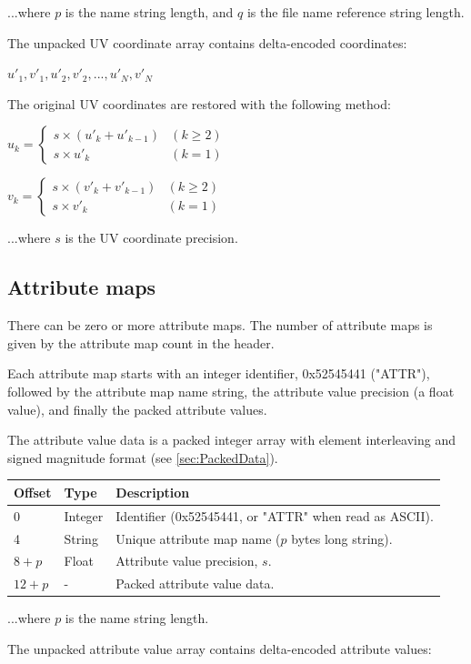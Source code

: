 ...where $p$ is the name string length, and $q$ is the file name reference string
length.

The unpacked UV coordinate array contains delta-encoded coordinates:

$u'_1, v'_1, u'_2, v'_2, ..., u'_N, v'_N$

The original UV coordinates are restored with the following method:

$u_k = \begin{cases}
s \times (u'_k + u'_{k-1}) & (k \geq 2)\\
s \times u'_k & (k = 1)
\end{cases}$

$v_k = \begin{cases}
s \times (v'_k + v'_{k-1}) & (k \geq 2)\\
s \times v'_k & (k = 1)
\end{cases}$

...where $s$ is the UV coordinate precision.

\subsection{Attribute maps}
There can be zero or more attribute maps. The number of attribute maps is given by the
attribute map count in the header.

Each attribute map starts with an integer identifier, 0x52545441 ("ATTR"), followed
by the attribute map name string, the attribute value precision (a float value), and
finally the packed attribute values.

The attribute value data is a packed integer array with element interleaving
and signed magnitude format (see \ref{sec:PackedData}).

\begin{tabular}{|l|l|l|}\hline
\textbf{Offset} &  \textbf{Type} & \textbf{Description}\\ \hline
0 & Integer & Identifier (0x52545441, or "ATTR" when read as ASCII).\\ \hline
4 & String & Unique attribute map name ($p$ bytes long string).\\ \hline
$8+p$ & Float & Attribute value precision, $s$.\\ \hline
$12+p$ & - & Packed attribute value data.\\ \hline
\end{tabular}

...where $p$ is the name string length.

The unpacked attribute value array contains delta-encoded attribute values:

